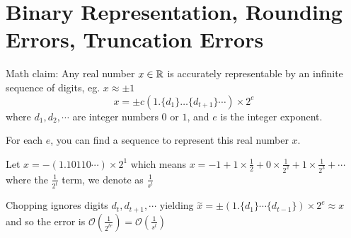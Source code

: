 \documentclass[12pt]{scrartcl}
\renewcommand{\O}{\mathcal{O}}
\begin{document}
\section{Binary Representation, Rounding Errors, Truncation Errors}

\begin{remark}
  Math claim: Any real number $x \in \mathbb R$ is accurately representable by an infinite sequence of digits, eg. $x \approx \pm 1$
  \[x = \pm c(1.\{d_1\}\ldots\{d_{t+1}\}\cdots) \times 2^e\]
  where $d_1, d_2, \cdots$ are integer numbers $0$ or $1$, and $e$ is the integer exponent.

  For each $e$, you can find a sequence to represent this real number $x$. 
\end{remark}

\begin{example}
  Let $x = -(1.10110\cdots) \times 2^1$ which means $x = -1 + 1 \times \frac{1}{2} + 0 \times \frac{1}{2^2} + 1 \times \frac{1}{2^3} + \cdots$
  where the $\frac{1}{2^t}$ term, we denote as $\frac{1}{s^t}$
\end{example}

\begin{definition}[Truncating]
  Chopping ignores digits $d_t, d_{t+1}, \cdots$ yielding $\overset{\sim}{x} = \pm (1.\{d_1\}\cdots\{d_{t-1}\}) \times 2^e \approx x$
  and so the error is $\O(\frac{1}{2^{te}}) = \O(\frac{1}{s^t})$
\end{definition}

\begin{definition}[Rounding]
  
\end{definition}
\end{document}
